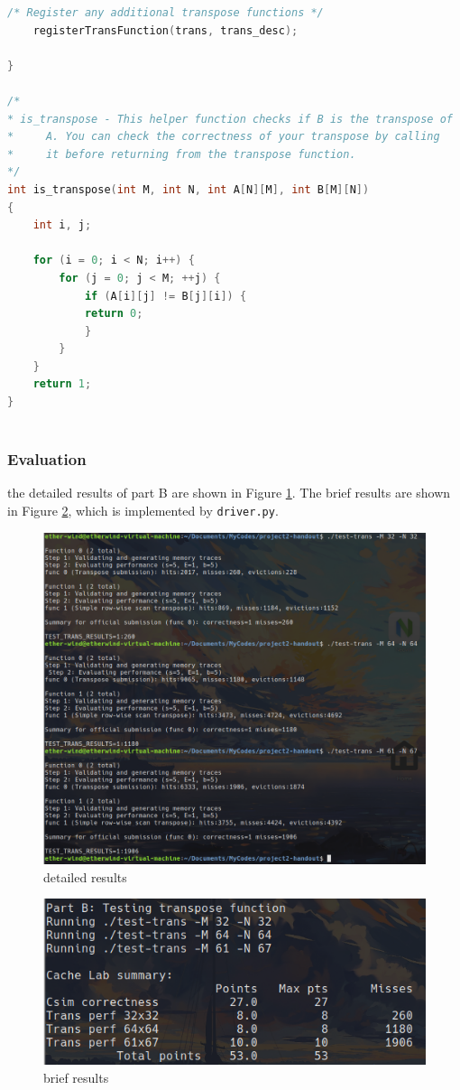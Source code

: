 \documentclass{article}
\begin{document}
\begin{lstlisting}[language=c++, caption={trans.c}, label={cd:2}]
    /* Register any additional transpose functions */
    registerTransFunction(trans, trans_desc); 

}

/* 
* is_transpose - This helper function checks if B is the transpose of
*     A. You can check the correctness of your transpose by calling
*     it before returning from the transpose function.
*/
int is_transpose(int M, int N, int A[N][M], int B[M][N])
{
    int i, j;

    for (i = 0; i < N; i++) {
        for (j = 0; j < M; ++j) {
            if (A[i][j] != B[j][i]) {
            return 0;
            }
        }
    }
    return 1;
}
    
\end{lstlisting}

\subsubsection{Evaluation}

the detailed results of part B are shown in Figure \ref{fig:3}. The brief results are shown in Figure \ref{fig:4}, which is implemented by \verb|driver.py|.

\begin{figure}[htbp]
    \centering
    \includegraphics[width = 0.7\linewidth]{trans-detail.png}
    \caption{detailed results}\label{fig:3}
\end{figure}

\begin{figure}[htbp]
    \centering
    \includegraphics[width = 0.7\linewidth]{trans-total.png}
    \caption{brief results}\label{fig:4}
\end{figure}
\end{document}
